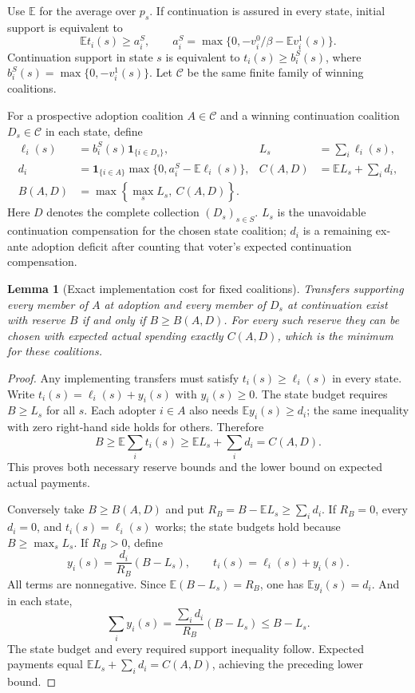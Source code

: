 \documentclass[11pt]{article}
\newtheorem{lemma}{Lemma}
\theoremstyle{definition}
\begin{document}
Use $\mathbb E$ for the average over $p_s$. If continuation is assured
in every state, initial support is equivalent to
\[
 \mathbb E t_i(s)\geq a_i^S,
 \qquad
 a_i^S=\max\{0,-v_i^0/\beta-\mathbb E v_i^1(s)\}.
\]
Continuation support in state $s$ is equivalent to
$t_i(s)\geq b_i^S(s)$, where $b_i^S(s)=\max\{0,-v_i^1(s)\}$.
Let $\mathcal C$ be the same finite family of winning coalitions.

For a prospective adoption coalition $A\in\mathcal C$ and a winning
continuation coalition $D_s\in\mathcal C$ in each state, define
\begin{align*}
 \ell_i(s)&=b_i^S(s)\mathbf1_{\{i\in D_s\}},
 &L_s&=\sum_i\ell_i(s),\\
 d_i&=\mathbf1_{\{i\in A\}}
        \max\{0,a_i^S-\mathbb E\ell_i(s)\},
 &C(A,D)&=\mathbb E L_s+\sum_i d_i,\\
 B(A,D)&=\max\left\{\max_s L_s,\ C(A,D)\right\}.
\end{align*}
Here $D$ denotes the complete collection $(D_s)_{s\in S}$.
$L_s$ is the unavoidable continuation compensation for the chosen
state coalition; $d_i$ is a remaining ex-ante adoption deficit after
counting that voter's expected continuation compensation.

\begin{lemma}[Exact implementation cost for fixed coalitions]
Transfers supporting every member of $A$ at adoption and every member
of $D_s$ at continuation exist with reserve $B$ if and only if
$B\geq B(A,D)$. For every such reserve they can be chosen with expected
actual spending exactly $C(A,D)$, which is the minimum for these
coalitions.
\end{lemma}
\begin{proof}
Any implementing transfers must satisfy $t_i(s)\geq\ell_i(s)$ in
every state. Write $t_i(s)=\ell_i(s)+y_i(s)$ with $y_i(s)\geq0$.
The state budget requires $B\geq L_s$ for all $s$. Each adopter
$i\in A$ also needs $\mathbb E y_i(s)\geq d_i$; the same inequality
with zero right-hand side holds for others. Therefore
\[
 B\geq\mathbb E\sum_i t_i(s)
       \geq\mathbb E L_s+\sum_i d_i=C(A,D).
\]
This proves both necessary reserve bounds and the lower bound on
expected actual payments.

Conversely take $B\geq B(A,D)$ and put
$R_B=B-\mathbb E L_s\geq\sum_i d_i$. If $R_B=0$, every $d_i=0$,
and $t_i(s)=\ell_i(s)$ works; the state budgets hold because
$B\geq\max_s L_s$. If $R_B>0$, define
\[
 y_i(s)=\frac{d_i}{R_B}(B-L_s),\qquad
 t_i(s)=\ell_i(s)+y_i(s).
\]
All terms are nonnegative. Since
$\mathbb E(B-L_s)=R_B$, one has $\mathbb E y_i(s)=d_i$.
And in each state,
\[
 \sum_i y_i(s)=\frac{\sum_i d_i}{R_B}(B-L_s)\leq B-L_s.
\]
The state budget and every required support inequality follow.
Expected payments equal $\mathbb E L_s+\sum_i d_i=C(A,D)$,
achieving the preceding lower bound.
\end{proof}
\end{document}
